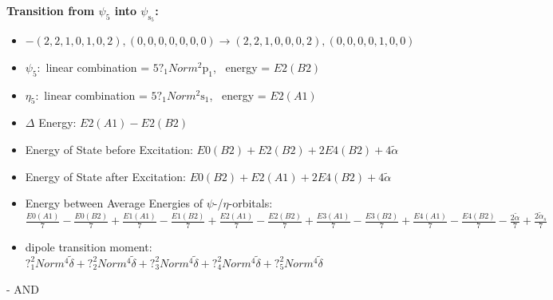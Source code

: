 \documentclass[12pt,a4paper]{article}
\begin{document}
        \noindent\textbf{Transition from $\psi_{5}$ into $\psi_{\text{s}_{5}}$:}
        \begin{itemize}
            \item $- (2, 2, 1, 0, 1, 0, 2), (0, 0, 0, 0, 0, 0, 0) \rightarrow (2, 2, 1, 0, 0, 0, 2), (0, 0, 0, 0, 1, 0, 0)$
        
            \item $\psi_{5}:$ linear combination = $5 ?_{1} Norm^{2} \text{p}_{1}$, \
            energy = $E2(B2)$
            
            \item $\eta_{5}:$ linear combination = $5 ?_{1} Norm^{2} \text{s}_{1}$, \
            energy = $E2(A1)$
            
                \item $\Delta$ Energy: $E2(A1) - E2(B2)$
                \item Energy of State before Excitation: $E0(B2) + E2(B2) + 2 E4(B2) + 4 \tilde{\alpha}$
                \item Energy of State after Excitation: $E0(B2) + E2(A1) + 2 E4(B2) + 4 \tilde{\alpha}$
                \item Energy between Average Energies of $\psi$-/$\eta$-orbitals: $\frac{E0(A1)}{7} - \frac{E0(B2)}{7} + \frac{E1(A1)}{7} - \frac{E1(B2)}{7} + \frac{E2(A1)}{7} - \frac{E2(B2)}{7} + \frac{E3(A1)}{7} - \frac{E3(B2)}{7} + \frac{E4(A1)}{7} - \frac{E4(B2)}{7} - \frac{2 \tilde{\alpha}}{7} + \frac{2 \tilde{\alpha}_{s}}{7}$
            
            \item dipole transition moment: $?_{1}^{2} Norm^{4} \tilde{\delta} + ?_{2}^{2} Norm^{4} \tilde{\delta} + ?_{3}^{2} Norm^{4} \tilde{\delta} + ?_{4}^{2} Norm^{4} \tilde{\delta} + ?_{5}^{2} Norm^{4} \tilde{\delta}$
        
        \end{itemize}
        
 -  AND 
\end{document}

